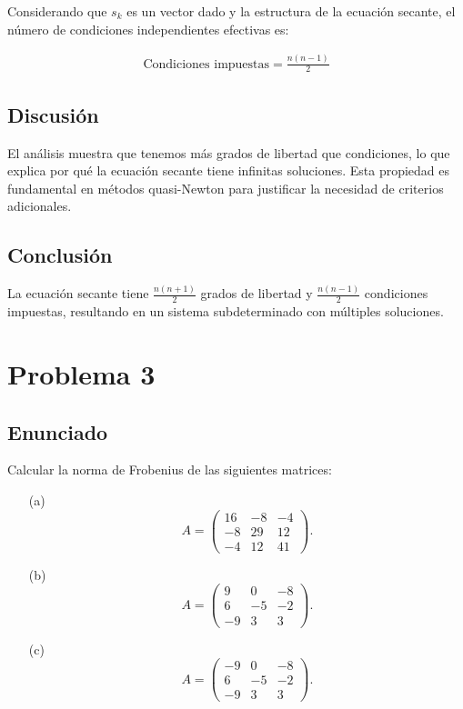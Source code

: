 \documentclass{article}
\begin{document}
Considerando que $s_k$ es un vector dado y la estructura de la ecuación secante, el número de condiciones independientes efectivas es:

\begin{align}
    \text{Condiciones impuestas} = \frac{n(n-1)}{2}
\end{align}

\subsection{Discusión}

El análisis muestra que tenemos más grados de libertad que condiciones, lo que explica por qué la ecuación secante tiene infinitas soluciones. Esta propiedad es fundamental en métodos quasi-Newton para justificar la necesidad de criterios adicionales.

\subsection{Conclusión}

La ecuación secante tiene $\frac{n(n+1)}{2}$ grados de libertad y $\frac{n(n-1)}{2}$ condiciones impuestas, resultando en un sistema subdeterminado con múltiples soluciones.

\section{Problema 3}

\subsection{Enunciado}

Calcular la norma de Frobenius de las siguientes matrices:

\begin{itemize}
    \item[(a)] \[A=\begin{pmatrix}
                        16 & -8 & -4\\
                        -8 & 29 & 12\\
                        -4 & 12 & 41
                    \end{pmatrix}.\]
    \item[(b)] \[A=\begin{pmatrix}
                        9 & 0 & -8\\
                        6 & -5 & -2\\
                        -9 & 3 & 3
                    \end{pmatrix}.\]
    \item[(c)] \[A=\begin{pmatrix}
                        -9 & 0 & -8\\
                        6 & -5 & -2\\
                        -9 & 3 & 3
                    \end{pmatrix}.\]
\end{itemize}
\end{document}
